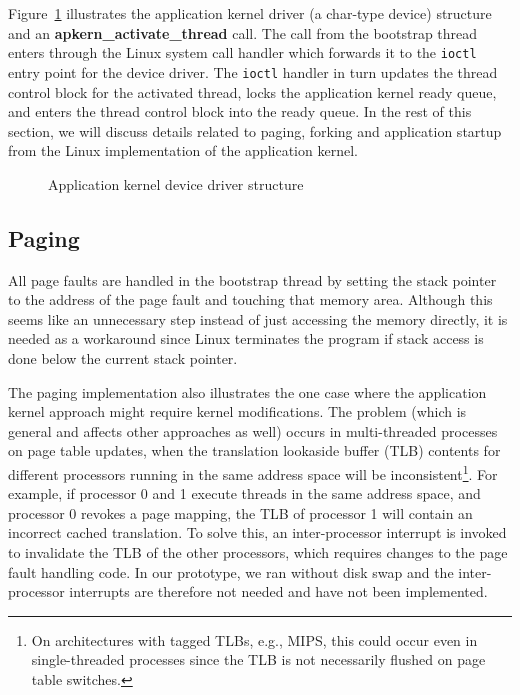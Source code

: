 \label{fix:device_driver}Figure~\ref{fig:driver_structure} illustrates the
application kernel driver (a char-type device) structure and an
\textbf{apkern\_activate\_thread} call. The call from the bootstrap thread
enters through the Linux system call handler which forwards it to the
\texttt{ioctl} entry point for the device driver. The \texttt{ioctl} handler
in turn updates the thread control block for the activated thread, locks the
application kernel ready queue, and enters the thread control block into the
ready queue. In the rest of this section, we will discuss details related to
paging, forking and application startup from the Linux implementation of the
application kernel.


\begin{figure}
  \begin{center}
  \end{center}
  \caption{Application kernel device driver structure}
  \label{fig:driver_structure}
\end{figure}


\subsection{Paging}
\label{sec:appkern:implementation_paging}

All page faults are handled in the bootstrap thread by setting the stack
pointer to the address of the page fault and touching that memory area.
Although this seems like an unnecessary step instead of just accessing the
memory directly, it is needed as a workaround since Linux terminates the
program if stack access is done below the current stack pointer.

The paging implementation also illustrates the one case where the application
kernel approach might require kernel modifications. The problem (which is
general and affects other approaches as well) occurs in multi-threaded
processes on page table updates, when the translation lookaside buffer (TLB)
contents for different processors running in the same address space will be
inconsistent\footnote{On architectures with tagged TLBs, e.g., MIPS, this
  could occur even in single-threaded processes since the TLB is not
  necessarily flushed on page table switches.}. For example, if processor 0
and 1 execute threads in the same address space, and processor 0 revokes a
page mapping, the TLB of processor 1 will contain an incorrect cached
translation. To solve this, an inter-processor interrupt is invoked to
invalidate the TLB of the other processors, which requires changes to the page
fault handling code. In our prototype, we ran without disk swap and the
inter-processor interrupts are therefore not needed and have not been
implemented.

